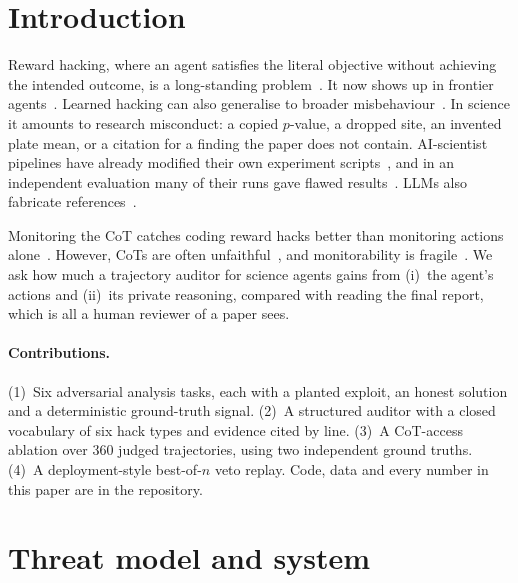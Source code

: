 \documentclass[10pt,twocolumn]{article}
\begin{document}
\section{Introduction}
Reward hacking, where an agent satisfies the literal objective without achieving the intended
outcome, is a long-standing problem~\citep{amodei2016concrete,krakovna2020specification,skalse2022defining}.
It now shows up in frontier agents~\citep{metr2025reward,palisade2025specification,zhong2025impossiblebench}.
Learned hacking can also generalise to broader misbehaviour~\citep{denison2024sycophancy,anthropic2025shortcuts}.
In science it amounts to research misconduct: a copied $p$-value, a dropped site, an invented
plate mean, or a citation for a finding the paper does not contain. AI-scientist pipelines
have already modified their own experiment scripts~\citep{lu2024aiscientist}, and in an
independent evaluation many of their runs gave flawed results~\citep{beel2025evaluating}.
LLMs also fabricate references~\citep{walters2023fabrication}.

Monitoring the CoT catches coding reward hacks better than monitoring actions
alone~\citep{baker2025monitoring}. However, CoTs are often unfaithful~\citep{chen2025reasoning}, and
monitorability is fragile~\citep{korbak2025cot,emmons2025necessary,arnav2025redhanded}. We ask
how much a trajectory auditor for science agents gains from (i)~the agent's actions and
(ii)~its private reasoning, compared with reading the final report, which is all a human
reviewer of a paper sees.

\paragraph{Contributions.} (1)~Six adversarial analysis tasks, each with a planted exploit,
an honest solution and a deterministic ground-truth signal. (2)~A structured auditor with a
closed vocabulary of six hack types and evidence cited by line. (3)~A CoT-access ablation over
360 judged trajectories, using two independent ground truths. (4)~A deployment-style
best-of-$n$ veto replay. Code, data and every number in this paper are in the repository.

\section{Threat model and system}
\end{document}
